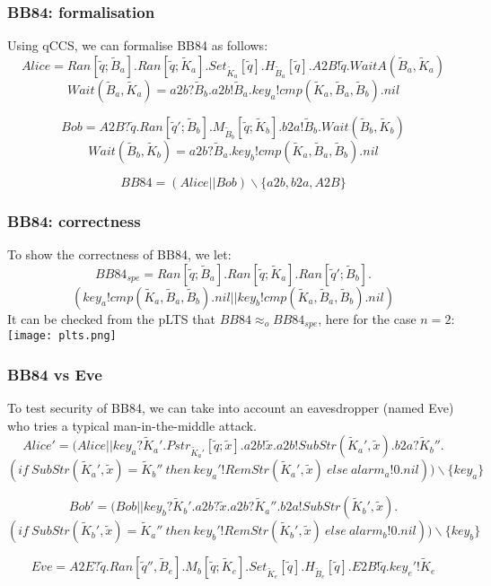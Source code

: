 \documentclass{beamer}
\begin{document}
\begin{frame}
\frametitle{BB84: formalisation}
Using qCCS, we can formalise BB84 as follows:
\[ Alice = Ran[\widetilde{q};\widetilde{B}_a].Ran[\widetilde{q};\widetilde{K}_a].Set_{\widetilde{K}_a}[\widetilde{q}].H_{\widetilde{B}_a}[\widetilde{q}].A2B!\widetilde{q}.WaitA(\widetilde{B}_a,\widetilde{K}_a) \]
\[ Wait(\widetilde{B}_a,\widetilde{K}_a) = a2b?\widetilde{B}_b.a2b!\widetilde{B}_a.key_a!cmp(\widetilde{K}_a,\widetilde{B}_a,\widetilde{B}_b).nil \]

\[ Bob = A2B?\widetilde{q}.Ran[\widetilde{q}';\widetilde{B}_b].M_{\widetilde{B}_b}[\widetilde{q};\widetilde{K}_b].b2a!\widetilde{B}_b.Wait(\widetilde{B}_b,\widetilde{K}_b) \]
\[ Wait(\widetilde{B}_b,\widetilde{K}_b) = a2b?\widetilde{B}_a.key_b!cmp(\widetilde{K}_a,\widetilde{B}_a,\widetilde{B}_b).nil \]

\[ BB84 = (Alice \lvert \rvert Bob) \backslash \{a2b,b2a,A2B\} \]
\end{frame}

\begin{frame}
\frametitle{BB84: correctness}
To show the correctness of BB84, we let:
\[ BB84_{spe} = Ran[\widetilde{q};\widetilde{B}_a].Ran[\widetilde{q};\widetilde{K}_a].Ran[\widetilde{q}';\widetilde{B}_b]. \] 
\[(key_a!cmp(\widetilde{K}_a,\widetilde{B}_a,\widetilde{B}_b).nil \lvert \rvert key_b!cmp(\widetilde{K}_a,\widetilde{B}_a,\widetilde{B}_b).nil)\]
It can be checked from the pLTS that $BB84 \approx_o BB84_{spe}$, here for the case $n = 2$:
\center \texttt{[image: plts.png]}
\end{frame}

\begin{frame}
\frametitle{BB84 vs Eve}
To test security of BB84, we can take into account an eavesdropper (named Eve) who tries a typical man-in-the-middle attack.
\[ Alice' = (Alice \lvert \rvert key_a?\widetilde{K}_a'.Pstr_{\widetilde{K}_a'}[\widetilde{q};\widetilde{x}].a2b!\widetilde{x}.a2b!SubStr(\widetilde{K}_a',\widetilde{x}).b2a?\widetilde{K}_b''.\] 
\[(if \ SubStr(\widetilde{K}_a',\widetilde{x}) = \widetilde{K}_b'' \ then \ key_a'!RemStr(\widetilde{K}_a',\widetilde{x}) \ else \ alarm_a!0.nil)) \backslash \{key_a\} \]

\[ Bob' = (Bob \lvert \rvert key_b?\widetilde{K}_b'.a2b?\widetilde{x}.a2b?\widetilde{K}_a''.b2a!SubStr(\widetilde{K}_b',\widetilde{x}). \]
\[ (if \ SubStr(\widetilde{K}_b',\widetilde{x}) = \widetilde{K}_a'' \ then \ key_b'!RemStr(\widetilde{K}_b',\widetilde{x}) \ else \ alarm_b!0.nil)) \backslash \{key_b\} \]

\[ Eve = A2E?\widetilde{q}.Ran[\widetilde{q}'',\widetilde{B}_e].M_b[\widetilde{q};\widetilde{K}_e].Set_{\widetilde{K}_e}[\widetilde{q}].H_{\widetilde{B}_e}[\widetilde{q}].E2B!\widetilde{q}.key_e'!\widetilde{K}_e\]
\end{frame}
\end{document}
